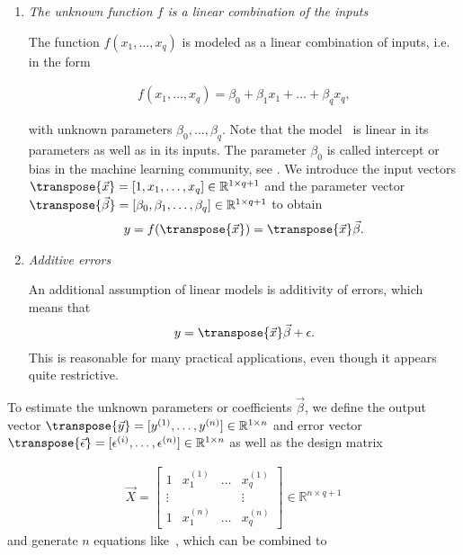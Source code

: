 \begin{enumerate}
	\item \emph{The unknown function $f$ is a linear combination of the inputs}
	
	The function $f(x_1, \dots, x_q)$ is modeled as a linear combination of inputs, i.e. in the form 
	
	\begin{align} \label{eq:linCombOfInputs}
		f(x_1, \dots, x_q) = \beta_0 + \beta_1 x_1 + \dots + \beta_q x_q,
	\end{align}
	
	with unknown parameters $\beta_0, \dots, \beta_q$. Note that the model~ is linear in its parameters as well as in its inputs. The parameter $\beta_0$ is called intercept or bias in the machine learning community, see \cite{bishop2006patternRecognition}. We introduce the input vectors $\transpose{\vec{x}} = [1, x_1, \dots, x_q] \in \mathbb{R}^{1 \times q+1}$ and the parameter vector $\transpose{\vec{\beta}} = [\beta_0, \beta_1, \dots, \beta_q] \in \mathbb{R}^{1 \times q+1}$ to obtain 
	\begin{align}
		y = f(\transpose{\vec{x}}) = \transpose{\vec{x}} \vec{\beta}.
	\end{align}
		
	\item \emph{Additive errors}
	
	An additional assumption of linear models is additivity of errors, which means that	
	\begin{align} \label{eq:linModelOneDim}
		y = \transpose{\vec{x}} \vec{\beta} + \epsilon.
	\end{align}
	This is reasonable for many practical applications, even though it appears quite restrictive. 
\end{enumerate}

To estimate the unknown parameters or coefficients $\vec{\beta}$, we define the output vector $\transpose{\vec{y}} = [y^{(1)}, \dots, y^{(n)}] \in \mathbb{R}^{1 \times n}$ and error vector $\transpose{\vec{\epsilon}} = [\epsilon^{(i)}, \dots, \epsilon^{(n)}] \in \mathbb{R}^{1 \times n}$ as well as the design matrix  

\begin{align} \label{eq:design-matrix}
	\vec{X} = \begin{bmatrix}   1     & x^{(1)}_1 & \dots & x^{(1)}_q \\ 
								  	  \vdots &        &       & \vdots \\ 
				  		  		1     & x^{(n)}_1 & \dots & x^{(n)}_q  
		\end{bmatrix} \in \mathbb{R}^{n \times q+1}		
\end{align}
%
and generate $n$ equations like~, which can be combined to 

